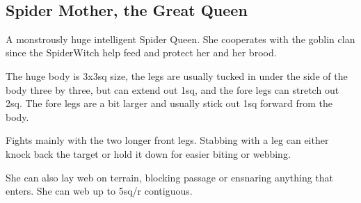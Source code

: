 \


\goodbreak
\subsection*{Spider Mother, the Great Queen}

A monstrously huge intelligent Spider Queen. She cooperates with the goblin clan since the SpiderWitch help feed and protect her and her brood.

The huge body is 3x3sq size, the legs are usually tucked in under the side of the body three by three, but can extend out 1sq, and the fore legs can stretch out 2sq. The fore legs are a bit larger and usually stick out 1sq forward from the body.

Fights mainly with the two longer front legs. Stabbing with a leg can either knock back the target or hold it down for easier biting or webbing.

She can also lay web on terrain, blocking passage or ensnaring anything that enters. She can web up to 5sq/r contiguous.

\

